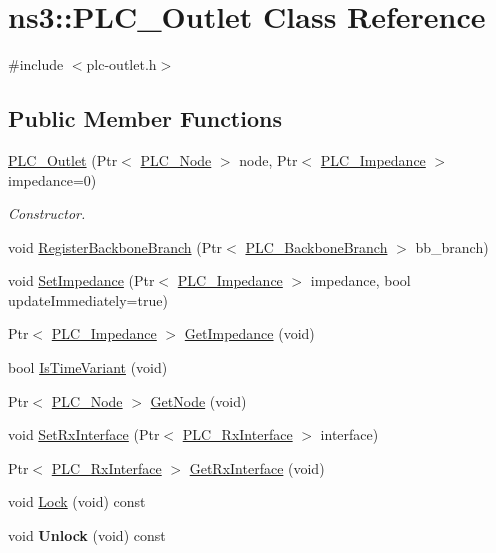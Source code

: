 \hypertarget{classns3_1_1PLC__Outlet}{\section{ns3\-:\-:\-P\-L\-C\-\_\-\-Outlet \-Class \-Reference}
\label{classns3_1_1PLC__Outlet}
}


{\ttfamily \#include $<$plc-\/outlet.\-h$>$}

\subsection*{\-Public \-Member \-Functions}
\begin{DoxyCompactItemize}
\item 
\hyperlink{classns3_1_1PLC__Outlet_a20410290c64c5ee366128c3edc30fdc9}{\-P\-L\-C\-\_\-\-Outlet} (\-Ptr$<$ \hyperlink{classns3_1_1PLC__Node}{\-P\-L\-C\-\_\-\-Node} $>$ node, \-Ptr$<$ \hyperlink{classns3_1_1PLC__ValueBase}{\-P\-L\-C\-\_\-\-Impedance} $>$ impedance=0)
\begin{DoxyCompactList}\small\item\em \-Constructor. \end{DoxyCompactList}\item 
void \hyperlink{classns3_1_1PLC__Outlet_a0c15b46c212ab77c95a9d18c1ce47726}{\-Register\-Backbone\-Branch} (\-Ptr$<$ \hyperlink{classns3_1_1PLC__BackboneBranch}{\-P\-L\-C\-\_\-\-Backbone\-Branch} $>$ bb\-\_\-branch)
\item 
void \hyperlink{classns3_1_1PLC__Outlet_a32be6c4aa7df70885ed9bdb9b5436b15}{\-Set\-Impedance} (\-Ptr$<$ \hyperlink{classns3_1_1PLC__ValueBase}{\-P\-L\-C\-\_\-\-Impedance} $>$ impedance, bool update\-Immediately=true)
\item 
\-Ptr$<$ \hyperlink{classns3_1_1PLC__ValueBase}{\-P\-L\-C\-\_\-\-Impedance} $>$ \hyperlink{classns3_1_1PLC__Outlet_a52267b6a122a2bf70321338dfd206b58}{\-Get\-Impedance} (void)
\item 
bool \hyperlink{classns3_1_1PLC__Outlet_a36a30f5393c98fb09da8b97b74bb50d3}{\-Is\-Time\-Variant} (void)
\item 
\-Ptr$<$ \hyperlink{classns3_1_1PLC__Node}{\-P\-L\-C\-\_\-\-Node} $>$ \hyperlink{classns3_1_1PLC__Outlet_a52917fa7fdc4eecd5b96b793b6a096b7}{\-Get\-Node} (void)
\item 
void \hyperlink{classns3_1_1PLC__Outlet_a6aade3f2f29e273669f65713ffdb5b7a}{\-Set\-Rx\-Interface} (\-Ptr$<$ \hyperlink{classns3_1_1PLC__RxInterface}{\-P\-L\-C\-\_\-\-Rx\-Interface} $>$ interface)
\item 
\-Ptr$<$ \hyperlink{classns3_1_1PLC__RxInterface}{\-P\-L\-C\-\_\-\-Rx\-Interface} $>$ \hyperlink{classns3_1_1PLC__Outlet_a94c11cdaa6097ad213bfea7f7fb17287}{\-Get\-Rx\-Interface} (void)
\item 
void \hyperlink{classns3_1_1PLC__Outlet_a13c9901ccfd9a557ad8bea25451e961b}{\-Lock} (void) const 
\item 
\hypertarget{classns3_1_1PLC__Outlet_a78519f9e3b8b7ec16567dcf0cf5e654e}{void {\bfseries \-Unlock} (void) const }\label{classns3_1_1PLC__Outlet_a78519f9e3b8b7ec16567dcf0cf5e654e}

\end{DoxyCompactItemize}

